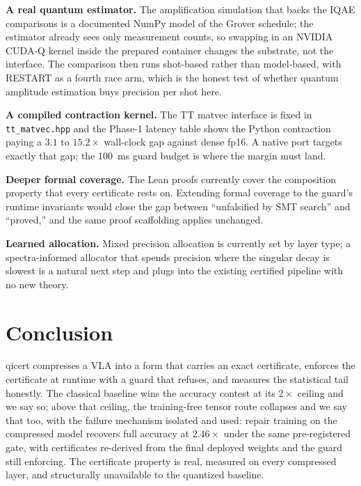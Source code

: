 \documentclass[conference,10pt]{IEEEtran}
\begin{document}
\textbf{A real quantum estimator.} The amplification simulation that
backs the IQAE comparisons is a documented NumPy model of the Grover
schedule; the estimator already sees only measurement counts, so swapping
in an NVIDIA CUDA-Q kernel inside the prepared container changes the
substrate, not the interface. The comparison then runs shot-based rather
than model-based, with RESTART as a fourth race arm, which is the honest
test of whether quantum amplitude estimation buys precision per shot here.

\textbf{A compiled contraction kernel.} The TT matvec interface is fixed
in \texttt{tt\_matvec.hpp} and the Phase-1 latency table shows the Python
contraction paying a $3.1$ to $15.2\times$ wall-clock gap against dense
fp16. A native port targets exactly that gap; the 100~ms guard budget is
where the margin must land.

\textbf{Deeper formal coverage.} The Lean proofs currently cover the
composition property that every certificate rests on. Extending formal
coverage to the guard's runtime invariants would close the gap between
``unfalsified by SMT search'' and ``proved,'' and the same proof
scaffolding applies unchanged.

\textbf{Learned allocation.} Mixed precision allocation is currently set
by layer type; a spectra-informed allocator that spends precision where
the singular decay is slowest is a natural next step and plugs into the
existing certified pipeline with no new theory.

\section{Conclusion}

qicert compresses a VLA into a form that carries an exact certificate,
enforces the certificate at runtime with a guard that refuses, and measures
the statistical tail honestly. The classical baseline wins the accuracy
contest at its $2\times$ ceiling and we say so; above that ceiling, the
training-free tensor route collapses and we say that too, with the
failure mechanism isolated and used: repair training on the compressed
model recovers full accuracy at $2.46\times$ under the same pre-registered
gate, with certificates re-derived from the final deployed weights and the
guard still enforcing. The certificate property is real, measured on every
compressed layer, and structurally unavailable to the quantized baseline.
\end{document}
